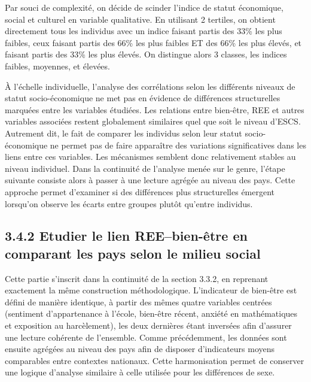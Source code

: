 \documentclass[
  french,
  11pt,
  a4paper,
  oneside]{report}
\begin{document}
Par souci de complexité, on décide de scinder l'indice de statut
économique, social et culturel en variable qualitative. En utilisant 2
tertiles, on obtient directement tous les individus avec un indice
faisant partis des 33\% les plus faibles, ceux faisant partis des 66\%
les plus faibles ET des 66\% les plus élevés, et faisant partis des 33\%
les plus élevés. On distingue alors 3 classes, les indices faibles,
moyennes, et élevées.

À l'échelle individuelle, l'analyse des corrélations selon les
différents niveaux de statut socio-économique ne met pas en évidence de
différences structurelles marquées entre les variables étudiées. Les
relations entre bien-être, REE et autres variables associées restent
globalement similaires quel que soit le niveau d'ESCS. Autrement dit, le
fait de comparer les individus selon leur statut socio-économique ne
permet pas de faire apparaître des variations significatives dans les
liens entre ces variables. Les mécanismes semblent donc relativement
stables au niveau individuel. Dans la continuité de l'analyse menée sur
le genre, l'étape suivante consiste alors à passer à une lecture agrégée
au niveau des pays. Cette approche permet d'examiner si des différences
plus structurelles émergent lorsqu'on observe les écarts entre groupes
plutôt qu'entre individus.

\subsection{3.4.2 Etudier le lien REE--bien-être en comparant les pays
selon le milieu
social}\label{etudier-le-lien-reebien-uxeatre-en-comparant-les-pays-selon-le-milieu-social}

Cette partie s'inscrit dans la continuité de la section 3.3.2, en
reprenant exactement la même construction méthodologique. L'indicateur
de bien-être est défini de manière identique, à partir des mêmes quatre
variables centrées (sentiment d'appartenance à l'école, bien-être
récent, anxiété en mathématiques et exposition au harcèlement), les deux
dernières étant inversées afin d'assurer une lecture cohérente de
l'ensemble. Comme précédemment, les données sont ensuite agrégées au
niveau des pays afin de disposer d'indicateurs moyens comparables entre
contextes nationaux. Cette harmonisation permet de conserver une logique
d'analyse similaire à celle utilisée pour les différences de sexe.
\end{document}
